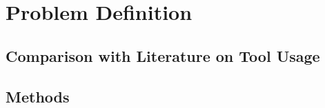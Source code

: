 

\chapter{Problem Definition}\label{chapter:problem_definition}







\section{Comparison with Literature on Tool Usage}

\section{Methods}